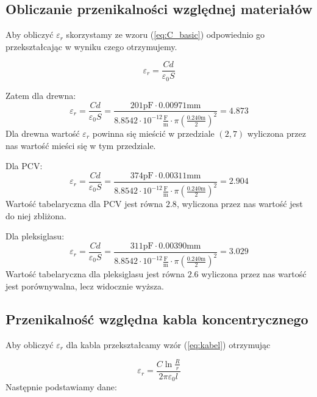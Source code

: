 \documentclass{fizykalab}
\newcommand{\mm}{\ensuremath{\text{mm}}}
\newcommand{\Fm}{\ensuremath{\frac{\text{F}}{\text{m}}}}
\begin{document}
\subsection{Obliczanie przenikalności względnej materiałów}

Aby obliczyć $\varepsilon_r$ skorzystamy ze wzoru
(\ref{eq:C_basic}) odpowiednio go przekształcając
w wyniku czego otrzymujemy.

\begin{equation}
    \varepsilon_r = \frac{Cd}{\varepsilon_0 S }
\end{equation}

Zatem dla drewna:
\begin{equation*}
    \varepsilon_r = \frac{Cd}{\varepsilon_0 S } = 
    \frac{201 \text{pF} \cdot 0.00971 \mm}
    {8.8542 \cdot 10^{-12} \Fm \cdot \pi (\frac{0.240 \text{m}}{2})^2 } = 4.873
\end{equation*}
Dla drewna wartość $\varepsilon_r$ powinna się mieścić w przedziale $(2, 7)$
wyliczona przez nas wartość mieści się w tym przedziale.

Dla PCV:
\begin{equation*}
    \varepsilon_r = \frac{Cd}{\varepsilon_0 S } = 
    \frac{374 \text{pF} \cdot 0.00311 \mm}
    {8.8542 \cdot 10^{-12} \Fm \cdot \pi
    (\frac{0.240 \text{m}}{2})^2 } = 2.904
\end{equation*}
Wartość tabelaryczna dla PCV jest równa $2.8$, wyliczona
przez nas wartość jest do niej zbliżona.

Dla pleksiglasu:
\begin{equation*}
    \varepsilon_r = \frac{Cd}{\varepsilon_0 S } = 
    \frac{311 \text{pF} \cdot 0.00390 \mm}
    {8.8542 \cdot 10^{-12} \Fm \cdot \pi
    (\frac{0.240 \text{m}}{2})^2 } = 3.029
\end{equation*}
Wartość tabelaryczna dla pleksiglasu jest równa $2.6$ 
wyliczona przez nas wartość jest porównywalna,
lecz widocznie wyższa.


\subsection{Przenikalność względna kabla koncentrycznego}
Aby obliczyć $\varepsilon_r$ dla kabla 
przekształcamy wzór (\ref{eq:kabel}) otrzymując

\begin{equation*}
    \varepsilon_r = \frac{C \ln \frac{R}{r}}{2 \pi \varepsilon_0 l}
\end{equation*}
Następnie podstawiamy dane:
\end{document}
